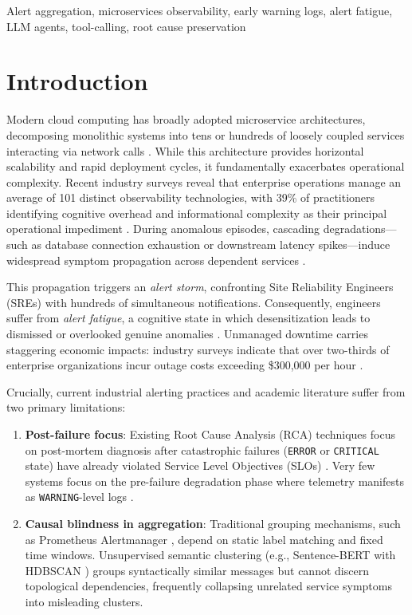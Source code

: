 \documentclass[conference]{IEEEtran}
\begin{document}
\begin{IEEEkeywords}
Alert aggregation, microservices observability, early warning logs, alert fatigue, LLM agents, tool-calling, root cause preservation
\end{IEEEkeywords}

\section{Introduction}
Modern cloud computing has broadly adopted microservice architectures, decomposing monolithic systems into tens or hundreds of loosely coupled services interacting via network calls \cite{kuang2024cola, pham2025rcaeval}. While this architecture provides horizontal scalability and rapid deployment cycles, it fundamentally exacerbates operational complexity. Recent industry surveys reveal that enterprise operations manage an average of 101 distinct observability technologies, with 39\% of practitioners identifying cognitive overhead and informational complexity as their principal operational impediment \cite{grafana2025}. During anomalous episodes, cascading degradations—such as database connection exhaustion or downstream latency spikes—induce widespread symptom propagation across dependent services \cite{kuang2024cola, yu2025alertguardian}.

This propagation triggers an \textit{alert storm}, confronting Site Reliability Engineers (SREs) with hundreds of simultaneous notifications. Consequently, engineers suffer from \textit{alert fatigue}, a cognitive state in which desensitization leads to dismissed or overlooked genuine anomalies \cite{pagerduty2020, tariq2025alertfatigue, jalalvand2024alertprioritisation}. Unmanaged downtime carries staggering economic impacts: industry surveys indicate that over two-thirds of enterprise organizations incur outage costs exceeding \$300,000 per hour \cite{pagerduty2026, itic2024downtime}.

Crucially, current industrial alerting practices and academic literature suffer from two primary limitations:
\begin{enumerate}
    \item \textbf{Post-failure focus}: Existing Root Cause Analysis (RCA) techniques focus on post-mortem diagnosis after catastrophic failures (\texttt{ERROR} or \texttt{CRITICAL} state) have already violated Service Level Objectives (SLOs) \cite{sre-workbook-ch5, pham2025rcaeval}. Very few systems focus on the pre-failure degradation phase where telemetry manifests as \texttt{WARNING}-level logs \cite{mendes2021loglevels}.
    \item \textbf{Causal blindness in aggregation}: Traditional grouping mechanisms, such as Prometheus Alertmanager \cite{prometheus-alertmanager}, depend on static label matching and fixed time windows. Unsupervised semantic clustering (e.g., Sentence-BERT with HDBSCAN \cite{sbert, hdbscan}) groups syntactically similar messages but cannot discern topological dependencies, frequently collapsing unrelated service symptoms into misleading clusters.
\end{enumerate}
\end{document}
